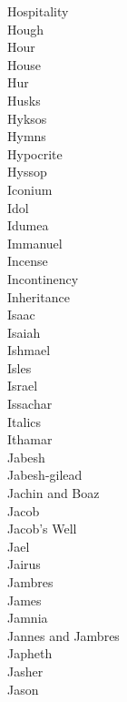 Hospitality  \\
Hough  \\
Hour  \\
House  \\
Hur  \\
Husks  \\
Hyksos  \\
Hymns  \\
Hypocrite  \\
Hyssop  \\
Iconium  \\
Idol  \\
Idumea  \\
Immanuel  \\
Incense  \\
Incontinency  \\
Inheritance  \\
Isaac  \\
Isaiah  \\
Ishmael  \\
Isles  \\
Israel  \\
Issachar  \\
Italics  \\
Ithamar  \\
Jabesh  \\
Jabesh-gilead  \\
Jachin and Boaz  \\
Jacob  \\
Jacob’s Well  \\
Jael  \\
Jairus  \\
Jambres  \\
James  \\
Jamnia  \\
Jannes and Jambres  \\
Japheth  \\
Jasher  \\
Jason  \\
